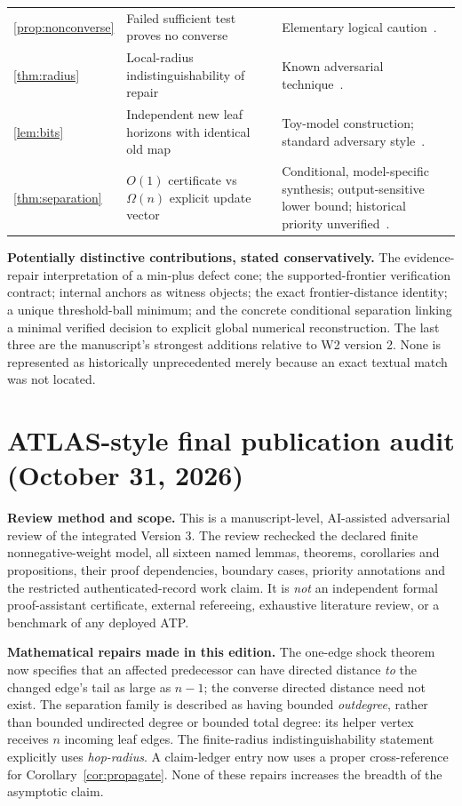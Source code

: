 \documentclass[11pt,letterpaper]{article}
\theoremstyle{definition}
\theoremstyle{remark}
\begin{document}
\begin{longtable}{@{}p{.14\linewidth}p{.47\linewidth}p{.32\linewidth}@{}}
\ref{prop:nonconverse}&Failed sufficient test proves no converse&Elementary logical caution~\cite{W1}.\\
\ref{thm:radius}&Local-radius indistinguishability of repair&Known adversarial technique~\cite{Roditty2004}.\\
\ref{lem:bits}&Independent new leaf horizons with identical old map&Toy-model construction; standard adversary style~\cite{Settlement}.\\
\ref{thm:separation}&$O(1)$ certificate vs $\Omega(n)$ explicit update vector&Conditional, model-specific synthesis; output-sensitive lower bound; historical priority unverified~\cite{Koenig2004,Dold2025}.\\
\bottomrule
\end{longtable}
\normalsize

\noindent\textbf{Potentially distinctive contributions, stated conservatively.} The evidence-repair interpretation of a min-plus defect cone; the supported-frontier verification contract; internal anchors as witness objects; the exact frontier-distance identity; a unique threshold-ball minimum; and the concrete conditional separation linking a minimal verified decision to explicit global numerical reconstruction. The last three are the manuscript's strongest additions relative to W2 version 2. None is represented as historically unprecedented merely because an exact textual match was not located.

\section{ATLAS-style final publication audit (October 31, 2026)}
\textbf{Review method and scope.} This is a manuscript-level, AI-assisted adversarial review of the integrated Version 3. The review rechecked the declared finite nonnegative-weight model, all sixteen named lemmas, theorems, corollaries and propositions, their proof dependencies, boundary cases, priority annotations and the restricted authenticated-record work claim. It is \emph{not} an independent formal proof-assistant certificate, external refereeing, exhaustive literature review, or a benchmark of any deployed ATP.

\textbf{Mathematical repairs made in this edition.} The one-edge shock theorem now specifies that an affected predecessor can have directed distance \emph{to} the changed edge's tail as large as $n-1$; the converse directed distance need not exist. The separation family is described as having bounded \emph{outdegree}, rather than bounded undirected degree or bounded total degree: its helper vertex receives $n$ incoming leaf edges. The finite-radius indistinguishability statement explicitly uses \emph{hop-radius}. A claim-ledger entry now uses a proper cross-reference for Corollary~\ref{cor:propagate}. None of these repairs increases the breadth of the asymptotic claim.
\end{document}
